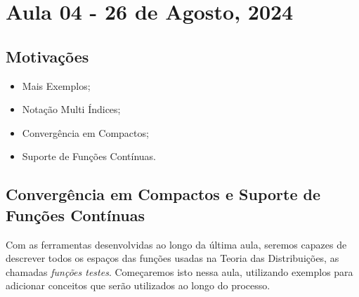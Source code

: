 \documentclass[../distribution_theory_notes.tex]{subfiles}
\begin{document}
\section{Aula 04 - 26 de Agosto, 2024}
\subsection{Motivações}
\begin{itemize}
	\item Mais Exemplos;
	\item Notação Multi Índices;
	\item Convergência em Compactos;
	\item Suporte de Funções Contínuas.
\end{itemize}
\subsection{Convergência em Compactos e Suporte de Funções Contínuas}
Com as ferramentas desenvolvidas ao longo da última aula, seremos capazes de descrever todos os espaços das funções usadas na Teoria das Distribuições, as chamadas \textit{funções testes}. Começaremos isto nessa aula, utilizando exemplos para adicionar conceitos que serão utilizados ao longo do processo.
\end{document}
